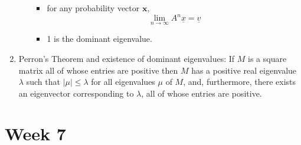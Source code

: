 \documentclass{article}
\begin{document}
\begin{enumerate}
\begin{enumerate}
\begin{itemize}
                        \item for any probability vector $\textbf{x}$,
                            $$
                            \lim _{n \rightarrow \infty} A^n \underline{x}=\underline{v}
                            $$

                        \item 1 is the dominant eigenvalue.

                    \end{itemize}
            \end{enumerate}


        \item Perron's Theorem and existence of dominant eigenvalues: If $M$ is a square matrix all of whose entries are positive then $M$ has a positive real eigenvalue $\lambda$ such that $|\mu| \leq \lambda$ for all eigenvalues $\mu$ of $M$, and, furthermore, there exists an eigenvector corresponding to $\lambda$, all of whose entries are positive.

    \end{enumerate}

\section{Week 7}
\end{document}
